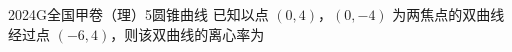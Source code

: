 
\begin{problem}{2024}{G}{全国甲卷（理）}{5}{圆锥曲线}
已知以点 $(0,4)$，$(0,-4)$ 为两焦点的双曲线经过点 $(-6,4)$，则该双曲线的离心率为
\begin{choices}
\end{choices}
\end{problem}